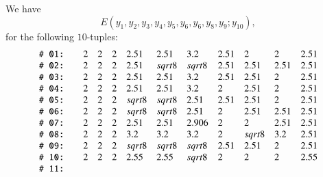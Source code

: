 \begin{tarskidata}
\begin{tarski}

\begin{lemma}
We have 
   $$
   E(y_1,y_2,y_3,y_4,y_5,y_6,y_6,y_8,y_9;y_{10}),
   $$
for the following $10$-tuples:
$$
\def\tuid#1{\relax} %
\def\rr#1{\text{\tt \# #1:}}
\begin{array}{llllllllllll}
%
 \rr{01}&\tuid{EKTYKKO}\tlabel{tarski:E:part4:4}
   &    2 &2 &2 &  2.51& 2.51 &3.2&   2.51 & 2 & 2 & 2.51\\
%
 \rr{02}&\tuid{TZKIBQD}\tlabel{tarski:E:part4:5}
   &2 &2 &2 &2.51& \sqrt{8} &\sqrt{8}& 2.51 & 2.51 & 2.51 & 2.51\\
%
 \rr{03}&\tuid{NYHXWOU}\tlabel{tarski:E:part4:6}
   &2 &2 &2 &2.51& 2.51 &3.2& 2.51 & 2.51 & 2 & 2.51\\
%
 \rr{04}&\tuid{HCEDPSK}\tlabel{tarski:E:part4:7}
   &2 &2 &2 &2.51& 2.51 &3.2& 2 & 2.51 & 2 & 2.51\\
%
 \rr{05}&\tuid{ZDKFOUK}\tlabel{tarski:E:part4:8}
   &2 &2 &2 &\sqrt{8}& \sqrt{8} &2.51& 2.51 & 2.51 & 2 &  2.51\\
%
 \rr{06}&\tuid{OQXGZCQ}\tlabel{tarski:E:part4:9}
   &2 &2 &2 &\sqrt{8}& \sqrt{8} &2.51& 2 & 2.51 & 2.51 &  2.51\\
%
 \rr{07}&\tuid{SDUXZXL}\tlabel{tarski:E1453}
   &2 &2 &2 &2.51& 2.51 &2.906& 2 & 2 &2.51 & 2.51\\
%
 \rr{08}&\tuid{QFJLWUC}\tlabel{tarski:dcg-p142}
   &2 &2 &2 &   3.2& 3.2 &3.2&   2 & \sqrt8 & 3.2 &  2.51\\
%
 \rr{09}&\tuid{TVBTKEK}\tlabel{tarski:node}
   &2 &2 &2 &\sqrt8& \sqrt8 &\sqrt8& 2.51 & 2.51 & 2 & 2.51\\ 
%
 \rr{10}&\tuid{GVKETKP} \tlabel{tarski:2t0-doesnt-pass-through}%
   &2 &2 &2 & 2.55&  2.55 & \sqrt{8}&  2 & 2 & 2 & 2.55\\
 \rr{11}&\tuid{RPIOZZC}\tlabel{tarski:last:E}%

\end{array}$$
\end{lemma}
\end{tarski}
\end{tarskidata}
